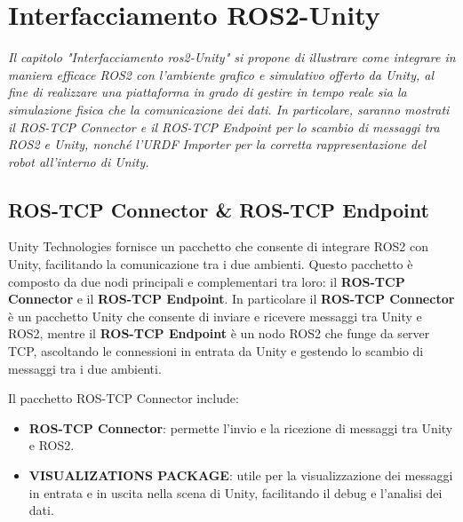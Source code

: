 \documentclass[11pt]{report}
\begin{document}
\section{Interfacciamento ROS2-Unity}

\textit{Il capitolo "Interfacciamento ros2-Unity" si propone di illustrare come integrare in maniera efficace ROS2 con l’ambiente grafico e simulativo offerto da Unity, al fine di realizzare una piattaforma in grado di gestire in tempo reale sia la simulazione fisica che la comunicazione dei dati. In particolare, saranno mostrati il ROS-TCP Connector e il ROS-TCP Endpoint per lo scambio di messaggi tra ROS2 e Unity, nonché l'URDF Importer per la corretta rappresentazione del robot all'interno di Unity.}

\subsection{ROS-TCP Connector \& ROS-TCP Endpoint}
Unity Technologies fornisce un pacchetto che consente di integrare ROS2 con Unity, facilitando la comunicazione tra i due ambienti. Questo pacchetto è composto da due nodi principali e complementari tra loro: il \textbf{ROS-TCP Connector} e il \textbf{ROS-TCP Endpoint}.
In particolare il \textbf{ROS-TCP Connector} è un pacchetto Unity che consente di inviare e ricevere messaggi tra Unity e ROS2, mentre il \textbf{ROS-TCP Endpoint} è un nodo ROS2 che funge da server TCP, ascoltando le connessioni in entrata da Unity e gestendo lo scambio di messaggi tra i due ambienti.
\newline

Il pacchetto ROS-TCP Connector include:

\begin{itemize}
    \item \textbf{ROS-TCP Connector}: permette l’invio e la ricezione di messaggi tra Unity e ROS2.
    \item \textbf{VISUALIZATIONS PACKAGE}: utile per la visualizzazione dei messaggi in entrata e in uscita nella scena di Unity, facilitando il debug e l'analisi dei dati.
\end{itemize}
\end{document}
